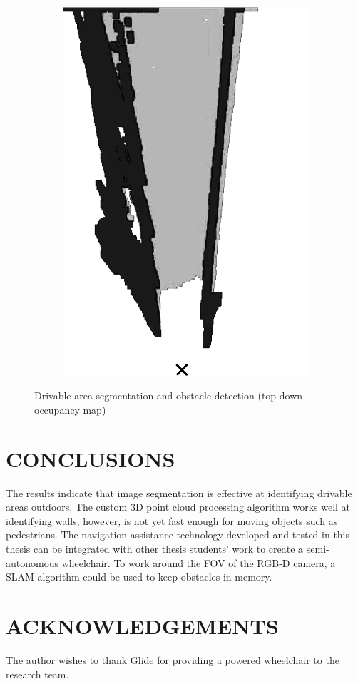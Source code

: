 \documentclass[10pt,twoside]{article}
\begin{document}
\begin{figure}[H]
\begin{subfigure}{.2\textwidth}
        \includegraphics[width=\linewidth,frame]{images/map_gs.png}
    \end{subfigure}
    \caption{Drivable area segmentation and obstacle detection (top-down occupancy map)}
    \label{fig:algorithm}
\end{figure}

\section*{\textbf{CONCLUSIONS}} %
The results indicate that image segmentation is effective at identifying drivable areas outdoors.
The custom 3D point cloud processing algorithm works well at identifying walls,
however, is not yet fast enough for moving objects such as pedestrians.
The navigation assistance technology developed and tested in this thesis can be integrated
with other thesis students' work to create a semi-autonomous wheelchair. To work around the FOV
of the RGB-D camera, a SLAM algorithm could be used to keep obstacles in memory.

\section*{\textbf{ACKNOWLEDGEMENTS}}
The author wishes to thank Glide for providing a powered wheelchair to the research team.

\printbibliography[title=\textbf{REFERENCES},heading=bibliography] %
\end{document}
